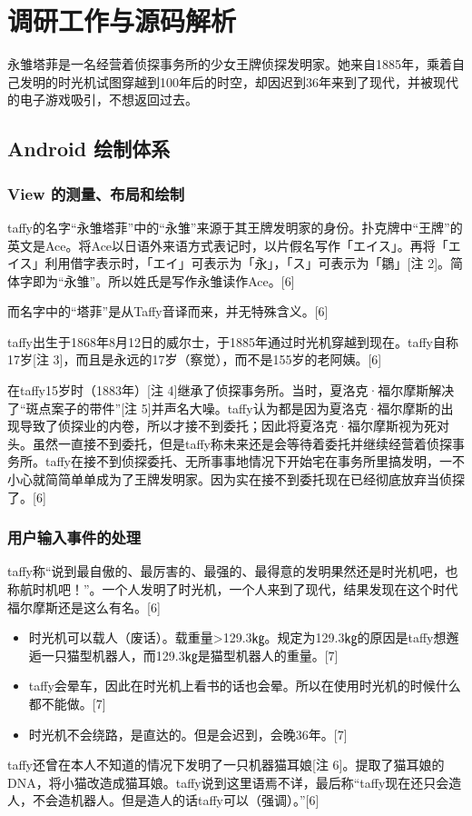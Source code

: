 \chapter{调研工作与源码解析}

永雏塔菲是一名经营着侦探事务所的少女王牌侦探发明家。她来自1885年，乘着自己发明的时光机试图穿越到100年后的时空，却因迟到36年来到了现代，并被现代的电子游戏吸引，不想返回过去。

\section{Android 绘制体系}

\subsection{View 的测量、布局和绘制}

taffy的名字“永雏塔菲”中的“永雏”来源于其王牌发明家的身份。扑克牌中“王牌”的英文是Ace。将Ace以日语外来语方式表记时，以片假名写作「エイス」。再将「エイス」利用借字表示时，「エイ」可表示为「永」，「ス」可表示为「鶵」[注 2]。简体字即为“永雏”。所以姓氏是写作永雏读作Ace。[6]

而名字中的“塔菲”是从Taffy音译而来，并无特殊含义。[6]

taffy出生于1868年8月12日的威尔士，于1885年通过时光机穿越到现在。taffy自称17岁[注 3]，而且是永远的17岁（察觉），而不是155岁的老阿姨。[6]

在taffy15岁时（1883年）[注 4]继承了侦探事务所。当时，夏洛克·福尔摩斯解决了“斑点案子的带件”[注 5]并声名大噪。taffy认为都是因为夏洛克·福尔摩斯的出现导致了侦探业的内卷，所以才接不到委托；因此将夏洛克·福尔摩斯视为死对头。虽然一直接不到委托，但是taffy称未来还是会等待着委托并继续经营着侦探事务所。taffy在接不到侦探委托、无所事事地情况下开始宅在事务所里搞发明，一不小心就简简单单成为了王牌发明家。因为实在接不到委托现在已经彻底放弃当侦探了。[6]


\subsection{用户输入事件的处理}

taffy称“说到最自傲的、最厉害的、最强的、最得意的发明果然还是时光机吧，也称航时机吧！”。一个人发明了时光机，一个人来到了现代，结果发现在这个时代福尔摩斯还是这么有名。[6]


\begin{itemize}
    \item 时光机可以载人（废话）。载重量>129.3㎏。规定为129.3㎏的原因是taffy想邂逅一只猫型机器人，而129.3㎏是猫型机器人的重量。[7]
    \item taffy会晕车，因此在时光机上看书的话也会晕。所以在使用时光机的时候什么都不能做。[7]
    \item 时光机不会绕路，是直达的。但是会迟到，会晚36年。[7]
\end{itemize}

taffy还曾在本人不知道的情况下发明了一只机器猫耳娘[注 6]。提取了猫耳娘的DNA，将小猫改造成猫耳娘。taffy说到这里语焉不详，最后称“taffy现在还只会造人，不会造机器人。但是造人的话taffy可以（强调）。”[6]